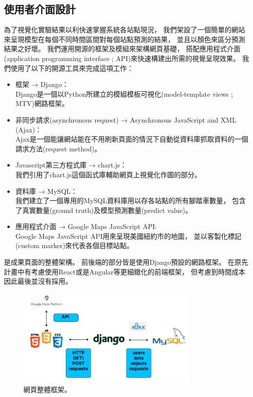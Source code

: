 \documentclass[a4paper,12pt]{extarticle}
\begin{document}
        \subsection{使用者介面設計}
            為了視覺化實驗結果以利快速掌握系統各站點現況，
            我們架設了一個簡單的網站來呈現模型在每個不同時間區間對每個站點預測的結果，
            並且以顏色來區分預測結果之好壞。
            我們運用開源的框架及模組來架構網頁基礎，
            搭配應用程式介面(application programming interface ; API)來快速構建出所需的視覺呈現效果。
            我們使用了以下的開源工具來完成這項工作：
            \begin{itemize}
                \item 框架 → Django： \\
                    Django是一個以Python所建立的模組模板可視化(model-template views ; MTV)網路框架。
                \item 非同步請求(asynchronous request) → Asynchronous JavaScript and XML (Ajax)： \\
                    Ajax是一個能讓網站能在不用刷新頁面的情況下自動從資料庫抓取資料的一個請求方法(request method)。
                \item Javascript第三方程式庫 → chart.js： \\
                    我們引用了chart.js這個函式庫輔助網頁上視覺化作圖的部分。
                \item 資料庫 → MySQL： \\
                    我們建立了一個專用的MySQL資料庫用以存各站點的所有腳踏車數量，
                    包含了真實數量(ground truth)及模型預測數量(predict value)。
                \item 應用程式介面 → Google Maps JavaScript API: \\
                    Google Maps JavaScript API用來呈現美國紐約市的地圖，
                    並以客製化標記(custom marker)來代表各個目標站點。
            \end{itemize}

            是成果頁面的整體架構。
            前後端的部分皆是使用Django預設的網路框架。
            在原先計畫中有考慮使用React或是Angular等更細緻化的前端框架，
            但考慮到時間成本因此最後並沒有採用。
            \begin{figure}[htb]
                \centering
                \includegraphics[width=0.8\textwidth]{webpage.png}
                \caption{
                    網頁整體框架。
                }
                \label{fig:webpage}
            \end{figure}
\end{document}
